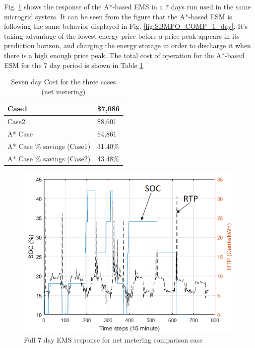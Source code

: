 Fig. \ref{fig:SBMPO_COMP_10_12} shows the response of the A*-based EMS in a  7 days run used in the same microgrid system.  It can be seen from the figure that the A*-based ESM is following the same behavior displayed in Fig. \ref{fig:SBMPO_COMP_1_day}. It's taking advantage of the lowest energy price before a price peak appears in its prediction horizon, and charging the energy storage in order to discharge it when there is a high enough price peak. The total cost of operation for the A*-based ESM for the 7 day period is shown in Table \ref{tab:Cost1}

\begin{table}[htb]
\caption{Seven day Cost for the three cases (net metering)}
\centering
\label{tab:Cost1}
\begin{tabular}{|l|l|}
\hline
Case1 & \$7,086 \\ \hline
Case2 & \$8,601 \\ \hline
A* Case & \$4,861 \\ \hline
A* Case \% savings (Case1) & 31.40\% \\ \hline
A* Case \% savings (Case2) & 43.48\% \\ \hline

\end{tabular}
\end{table}


\begin{figure}[!ht]
    \centering
    \includegraphics[width = \linewidth]{figs/SBMPO_COMP_10_12.png}
    \caption{Full 7 day EMS response for net metering comparison case}
    \label{fig:SBMPO_COMP_10_12}
\end{figure}


